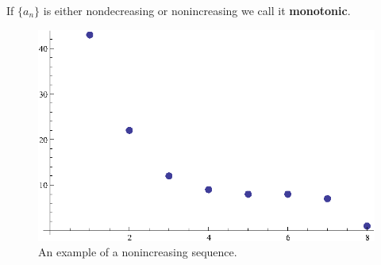 \begin{defn}
  If \(\{a_n\}\) is either nondecreasing or nonincreasing we call it \textbf{monotonic}.
  \begin{figure}[H]
    \begin{center}
      \includegraphics[scale=0.5]{continuous/sequence/nonincreasing.eps}
    \end{center}
    \caption{An example of a nonincreasing sequence.}
  \end{figure}
\end{defn}

